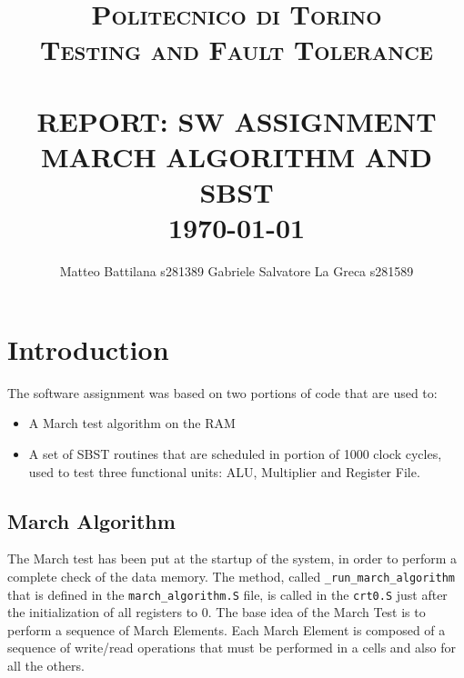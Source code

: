 \documentclass[paper=a4, fontsize=10pt]{scrartcl}	%
\title{	\normalsize \textsc{Politecnico di Torino\\Testing and Fault Tolerance} 	%
	\\[2.0cm]								%
	\HRule{0.5pt} \\						%
	\LARGE \textbf{\uppercase{Report: SW ASSIGNMENT\\March Algorithm and SBST}}	%
	\HRule{2pt} \\ [0.5cm]		%
	\normalsize 
	\today %
}
\author{
	Matteo Battilana s281389\newline
	Gabriele Salvatore La Greca s281589
}
\makeatletter
\def\printtitle{%
	{\centering \@title\par}}
\def\printauthor{%
	{\centering \large \@author}}
\makeatother
\begin{document}
	\thispagestyle{empty}		%
	
	\printtitle					%
	\vfill
	\printauthor				%
	\newpage
	\setcounter{page}{1}		%
	\section{Introduction}
	The software assignment was based on two portions of code that are used to:
	\begin{itemize}
		\itemsep0sp
		\item A March test algorithm on the RAM
		\item A set of SBST routines that are scheduled in portion of 1000 clock cycles, used to test three functional units: ALU, Multiplier and Register File.
	\end{itemize}

	\subsection{March Algorithm}
	The March test has been put at the startup of the system, in order to perform a complete check of the data memory.
	The method, called \texttt{\_run\_march\_algorithm} that is defined in the \texttt{march\_algorithm.S} file, is called in the \texttt{crt0.S} just after the initialization of all registers to 0.\newline\newline
	The base idea of the March Test is to perform a sequence of March Elements. Each March Element is composed of a sequence of write/read operations that must be performed in a cells and also for all the others.
	
\end{document}
